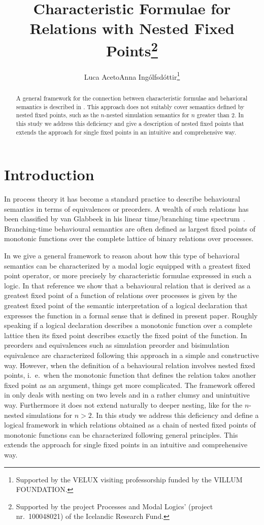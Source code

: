 \documentclass[submission]{eptcs}
\title{Characteristic Formulae for Relations with Nested Fixed
  Points\thanks{Supported by the project Processes and Modal Logics'
    (project nr.~100048021) of the Icelandic Research Fund.} }
\author{Luca Aceto\quad Anna Ing\'olfsd\'ottir\thanks{Supported by the
    VELUX visiting professorship funded by the VILLUM FOUNDATION.}
  \institute{ICE-TCS, School of Computer Science\\Reykjavik University \\
    Reykjavik, Iceland} \email{\quad $\{$luca,annai$\}$@ru.is}}
\begin{document}
\maketitle
\begin{abstract}
  A general framework for the connection between characteristic
  formulae and behavioral semantics is described in
  \cite{AILS2011}. This approach does not suitably cover semantics
  defined by nested fixed points, such as the $n$-nested simulation
  semantics for $n$ greater than $2$. In this study we address this
  deficiency and give a description of nested fixed points that
  extends the approach for single fixed points in an intuitive and
  comprehensive way.
\end{abstract}          

\section{Introduction}
In process theory it has become a standard practice to describe
behavioural semantics in terms of equivalences or preorders. A wealth
of such relations has been classified by van Glabbeek in his linear
time/branching time spectrum~\cite{vG2001}. Branching-time behavioural
semantics are often defined as largest fixed points of monotonic
functions over the complete lattice of binary relations over
processes.

In \cite{AILS2011} we give a general framework to reason about how
this type of behavioral semantics can be characterized by a modal
logic equipped with a greatest fixed point operator, or more precisely
by characteristic formulae expressed in such a logic. In that
reference we show that a behavioural relation that is derived as a
greatest fixed point of a function of relations over processes is
given by the greatest fixed point of the semantic interpretation of a
logical declaration that expresses the function in a formal sense that
is defined in present paper.  Roughly speaking if a logical
declaration describes a monotonic function over a complete lattice
then its fixed point describes exactly the fixed point of the
function. In \cite{AILS2011} preorders and equivalences such as simulation preorder
and bisimulation equivalence are characterized following this approach
in a simple and constructive way. However, when the definition of a
behavioural relation involves nested fixed points, i.~e.~when the
monotonic function that defines the relation takes another fixed point
as an argument, things get more complicated.  The framework offered in
\cite{AILS2011} only deals with nesting on two levels and in a rather
clumsy and unintuitive way. Furthermore it does not extend naturally
to deeper nesting, like for the $n$-nested simulations for $n>2$. In
this study we address this deficiency and define a logical framework
in which relations obtained as a chain of nested fixed points of
monotonic functions can be characterized following general
principles. This extends the approach for single fixed points in an
intuitive and comprehensive way.
\end{document}
